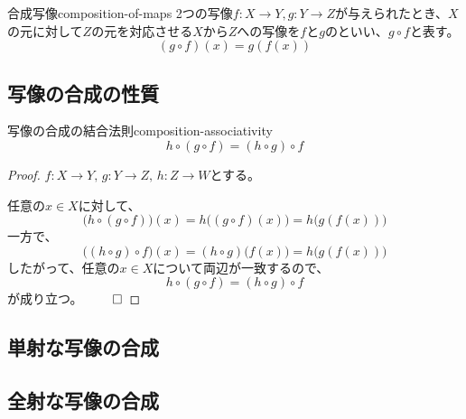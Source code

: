 \documentclass[../../../topic_linear-algebra]{subfiles}
\begin{document}
\begin{definition}{合成写像}{composition-of-maps}
  2つの写像$f\colon X \to Y, g\colon Y \to Z$が与えられたとき、$X$の元に対して$Z$の元を対応させる$X$から$Z$への写像を$f$と$g$のといい、$g \circ f$と表す。
  \begin{equation*}
    (g \circ f)(x) = g(f(x))
  \end{equation*}
\end{definition}

\subsection{写像の合成の性質}

\begin{theorem}{写像の合成の結合法則}{composition-associativity}
  \begin{equation*}
    h \circ (g \circ f) = (h \circ g) \circ f
  \end{equation*}
\end{theorem}

\begin{proof}
  $f\colon X\to Y, \, g\colon Y\to Z, \, h\colon Z\to W$とする。
  
  任意の$x\in X$に対して、
  \begin{equation*}
    \bigl(h\circ (g\circ f)\bigr)(x)
    = h\bigl((g\circ f)(x)\bigr)
    = h\bigl(g(f(x))\bigr)
  \end{equation*}
  一方で、
  \begin{equation*}
    \bigl((h\circ g)\circ f\bigr)(x)
    = (h\circ g)\bigl(f(x)\bigr)
    = h\bigl(g(f(x))\bigr)
  \end{equation*}
  したがって、任意の$x\in X$について両辺が一致するので、
  \begin{equation*}
    h\circ (g\circ f) = (h\circ g)\circ f
  \end{equation*}
  が成り立つ。 $\qed$
\end{proof}

\subsection{単射な写像の合成}

\begin{mindflow}
\end{mindflow}

\subsection{全射な写像の合成}

\begin{mindflow}
\end{mindflow}
\end{document}
